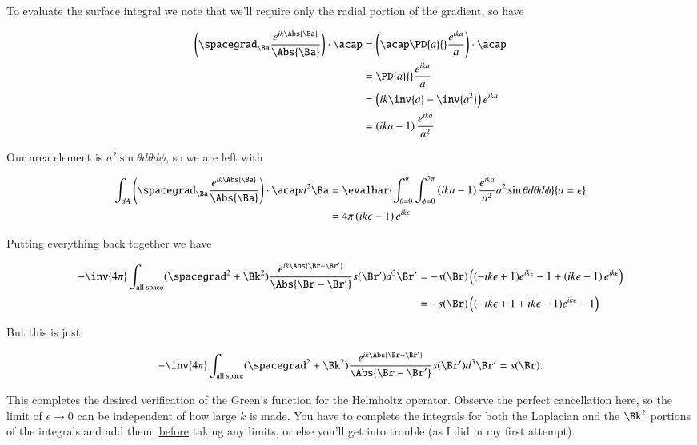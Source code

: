 To evaluate the surface integral we note that we'll require only the radial portion of the gradient, so have

\begin{align*}
\left( \spacegrad_\Ba \frac{e^{i k \Abs{\Ba}}}{\Abs{\Ba}} \right) \cdot \acap
&=
\left( \acap \PD{a}{} \frac{e^{i k a}}{a} \right) \cdot \acap \\
&=
\PD{a}{} \frac{e^{i k a}}{a} \\
&=
\left( i k \inv{a} - \inv{a^2} \right)
e^{i k a} \\
&=
\left( i k a - 1 \right)
\frac{e^{i k a}}{a^2}
\end{align*}

Our area element is $a^2 \sin\theta d\theta d\phi$, so we are left with

\begin{equation}\label{eqn:shortTimeDepPertubation:320}
\begin{aligned}
\int_{dA} \left( \spacegrad_\Ba \frac{e^{i k \Abs{\Ba}}}{\Abs{\Ba}} \right) \cdot \acap d^2 \Ba 
&=
\evalbar{
\int_{\theta = 0}^\pi \int_{\phi=0}^{2\pi}
\left( i k a - 1 \right)
\frac{e^{i k a}}{a^2}
a^2 \sin\theta d\theta d\phi 
}{a = \epsilon}
\\
&=
4 \pi
\left( i k \epsilon - 1 \right) e^{i k \epsilon}
\end{aligned}
\end{equation}

Putting everything back together we have

\begin{align*}
-\inv{4\pi} \int_{\text{all space}} (\spacegrad^2 + \Bk^2) \frac{e^{i k \Abs{\Br - \Br'}}}{\Abs{\Br - \Br'}} s(\Br') d^3 \Br'
&=
-s(\Br)
\left(
(-i k \epsilon + 1)e^{i k \epsilon} - 1 
+\left( i k \epsilon - 1 \right) e^{i k \epsilon}
\right) \\
&=
-s(\Br)
\left(
(-i k \epsilon + 1 + i k \epsilon - 1 )e^{i k \epsilon} - 1 
\right) 
\end{align*}

But this is just

\begin{equation}\label{eqn:shortTimeDepPertubation:330}
-\inv{4\pi} \int_{\text{all space}} (\spacegrad^2 + \Bk^2) \frac{e^{i k \Abs{\Br - \Br'}}}{\Abs{\Br - \Br'}} s(\Br') d^3 \Br' = s(\Br).
\end{equation}

This completes the desired verification of the Green's function for the Helmholtz operator.  Observe the perfect cancellation here, so the limit of $\epsilon \rightarrow 0$ can be independent of how large $k$ is made.  You have to complete the integrals for both the Laplacian and the $\Bk^2$ portions of the integrals and add them, \underline{before} taking any limits, or else you'll get into trouble (as I did in my first attempt).

\EndArticle
